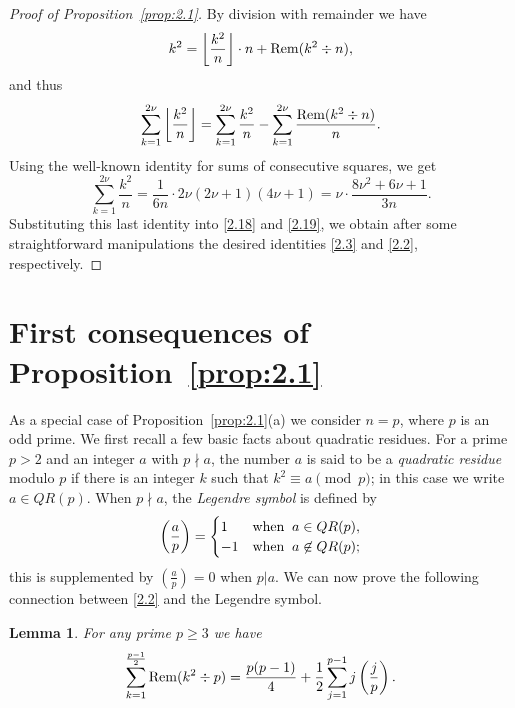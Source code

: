 \documentclass{amsart}
\theoremstyle{plain}
\newtheorem{lemma}[theorem]{Lemma}
\numberwithin{equation}{section}
\begin{document}
\begin{proof}[Proof of Proposition~\ref{prop:2.1}]
By division with remainder we have
\begin{equation}\label{2.20}
k^2 = \left\lfloor{\frac{k^2}{n}}\right\rfloor\cdot n + {\rm Rem}(k^2\div n),
\end{equation}
and thus
\begin{equation}\label{2.21}
\sum_{k=1}^{2\nu}\left\lfloor{\frac{k^2}{n}}\right\rfloor
=\sum_{k=1}^{2\nu}\frac{k^2}{n}
-\sum_{k=1}^{2\nu}\frac{{\rm Rem}(k^2\div n)}{n}.
\end{equation}
Using the well-known identity for sums of consecutive squares, we get
\begin{equation}\label{2.22}
\sum_{k=1}^{2\nu}\frac{k^2}{n}
=\frac{1}{6n}\cdot 2\nu(2\nu+1)(4\nu+1) = \nu\cdot\frac{8\nu^2+6\nu+1}{3n}.
\end{equation}
Substituting this last identity into \eqref{2.18} and \eqref{2.19}, we obtain
after some straightforward manipulations the desired identities \eqref{2.3} 
and \eqref{2.2}, respectively.
\end{proof}

\section{First consequences of Proposition~\ref{prop:2.1}}\label{sec:3}

As a special case of Proposition~\ref{prop:2.1}(a) we consider $n=p$, where $p$
is an odd prime. We first recall a few basic facts about quadratic residues. 
For a prime $p>2$ and an integer $a$ with 
$p\nmid a$, the number $a$ is said to be a {\it quadratic residue} modulo $p$ 
if there is an integer $k$ such that $k^2\equiv a\pmod{p}$; in this case we
write $a\in QR(p)$. When $p\nmid a$, the {\it Legendre symbol} is defined by
\begin{equation}\label{2.23}
\left(\frac{a}{p}\right) = \begin{cases}
1 &\hbox{when}\;\; a\in QR(p),\\
-1 &\hbox{when}\;\; a\not\in QR(p);
\end{cases}
\end{equation}
this is supplemented by $(\frac{a}{p})=0$ when $p|a$.
We can now prove the following connection between \eqref{2.2} and the Legendre
symbol.

\begin{lemma}\label{lem:2.3}
For any prime $p\geq 3$ we have
\begin{equation}\label{2.24}
\sum_{k=1}^{\frac{p-1}{2}}{\rm Rem}(k^2\div p) = \frac{p(p-1)}{4}
+\frac{1}{2}\sum_{j=1}^{p-1}j\left(\frac{j}{p}\right).
\end{equation}
\end{lemma}
\end{document}
